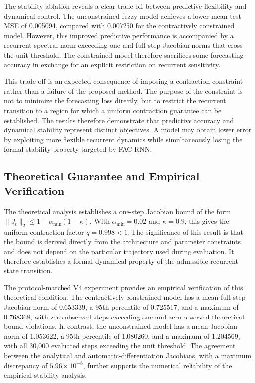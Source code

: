 \documentclass[journal]{IEEEtran}
\begin{document}
	The stability ablation reveals a clear trade-off between predictive flexibility and dynamical control. The unconstrained fuzzy model achieves a lower mean test MSE of 0.005094, compared with 0.007250 for the contractively constrained model. However, this improved predictive performance is accompanied by a recurrent spectral norm exceeding one and full-step Jacobian norms that cross the unit threshold. The constrained model therefore sacrifices some forecasting accuracy in exchange for an explicit restriction on recurrent sensitivity.
	
	This trade-off is an expected consequence of imposing a contraction constraint rather than a failure of the proposed method. The purpose of the constraint is not to minimize the forecasting loss directly, but to restrict the recurrent transition to a region for which a uniform contraction guarantee can be established. The results therefore demonstrate that predictive accuracy and dynamical stability represent distinct objectives. A model may obtain lower error by exploiting more flexible recurrent dynamics while simultaneously losing the formal stability property targeted by FAC-RNN.
	
	\subsection{Theoretical Guarantee and Empirical Verification}
	\label{subsec:theory_empirical}
	
The theoretical analysis establishes a one-step Jacobian bound of the form $\lVert J_t\rVert_2\leq1-\alpha_{\min}(1-\kappa)$. With $\alpha_{\min}=0.02$ and $\kappa=0.9$, this gives the uniform contraction factor $q=0.998<1$. The significance of this result is that the bound is derived directly from the architecture and parameter constraints and does not depend on the particular trajectory used during evaluation. It therefore establishes a formal dynamical property of the admissible recurrent state transition.

	The protocol-matched V4 experiment provides an empirical verification of this theoretical condition. The contractively constrained model has a mean full-step Jacobian norm of 0.653339, a 95th percentile of 0.725517, and a maximum of 0.768368, with zero observed steps exceeding one and zero observed theoretical-bound violations. In contrast, the unconstrained model has a mean Jacobian norm of 1.053622, a 95th percentile of 1.080260, and a maximum of 1.204569, with all 30,000 evaluated steps exceeding the unit threshold. The agreement between the analytical and automatic-differentiation Jacobians, with a maximum discrepancy of $5.96\times10^{-8}$, further supports the numerical reliability of the empirical stability analysis.
	
\end{document}
